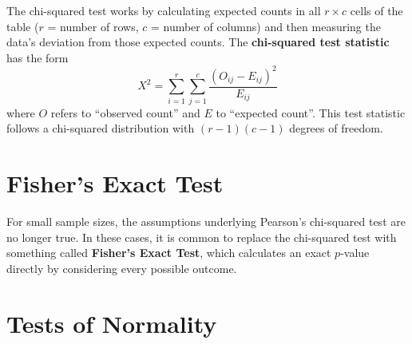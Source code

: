 The chi-squared test works by calculating expected counts in all $r \times c$ cells of the table ($r$ = number of rows, $c$ = number of columns) and then measuring the data's deviation from those expected counts. The \textbf{chi-squared test statistic} has the form
$$ X^2 = \sum_{i=1}^r \sum_{j=1}^c \frac{(O_{ij} - E_{ij})^2}{E_{ij}} $$
where $O$ refers to ``observed count'' and $E$ to ``expected count''. This test statistic follows a chi-squared distribution with $(r-1)(c-1)$ degrees of freedom.


\section{Fisher's Exact Test}

For small sample sizes, the assumptions underlying Pearson's chi-squared test are no longer true. In these cases, it is common to replace the chi-squared test with something called \textbf{Fisher's Exact Test}, which calculates an exact $p$-value directly by considering every possible outcome. 


\section{Tests of Normality}




